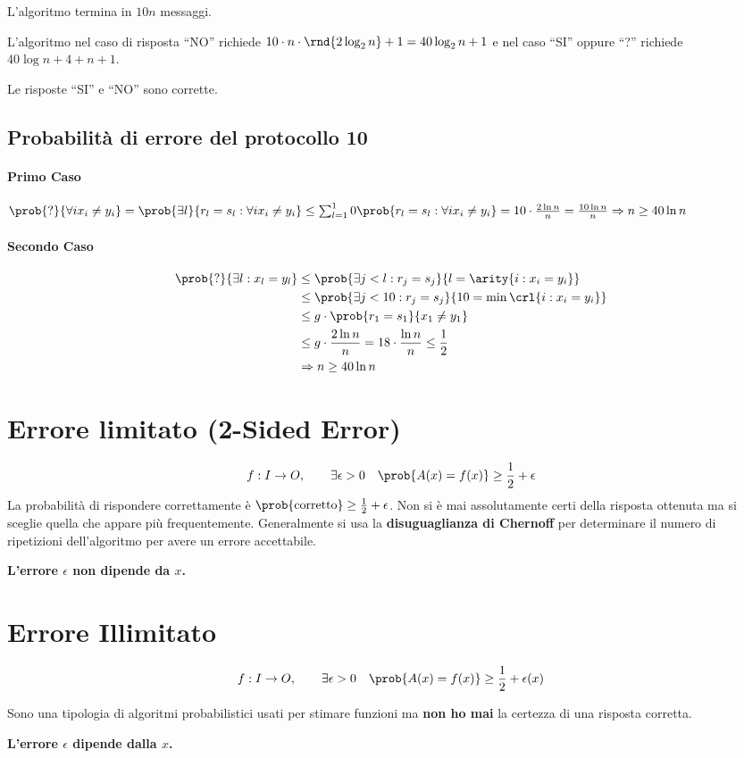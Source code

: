 \documentclass[\main/main.tex]{subfiles}
\begin{document}
L'algoritmo termina in \(10n\) messaggi.

L'algoritmo nel caso di risposta ``NO'' richiede \(10\cdot n \cdot \rnd{2 \log_2 n} + 1 = 40\log_2 n +1\) e nel caso ``SI'' oppure ``?'' richiede \(40 \log n + 4 + n +1\).

Le risposte ``SI'' e ``NO'' sono corrette.

\subsection{Probabilità di errore del protocollo 10}
\paragraph{Primo Caso} \(\prob{?}{\forall i x_i \neq y_i} = \prob{\exists l}{ r_l = s_l: \forall i x_i \neq y_i} \leq \sum_{l=1}^10 \prob{ r_l = s_l: \forall i x_i \neq y_i} = 10\cdot \frac{2\ln n}{n} = \frac{10\ln n}{n} \Rightarrow n \geq 40 \ln n\)
\paragraph{Secondo Caso}
\begin{align*}
	\prob{?}{\exists l: x_l = y_l} & \leq \prob{\exists j < l: r_j = s_j}{l= \arity{i: x_i = y_i}}           \\
	                               & \leq \prob{\exists j < 10: r_j = s_j}{10 = \min\crl{i: x_i = y_i}}      \\
	                               & \leq g\cdot \prob{r_1 = s_1}{x_1 \neq y_1}                              \\
	                               & \leq g\cdot \frac{2\ln n}{n} = 18\cdot \frac{\ln n}{n} \leq \frac{1}{2} \\
	                               & \Rightarrow n \geq 40 \ln n
\end{align*}

\section{Errore limitato (2-Sided Error)}
\[
	f: I \rightarrow O, \qquad \exists \epsilon > 0 \quad \prob{A(x) = f(x)} \geq \frac{1}{2} + \epsilon
\]
La probabilità di rispondere correttamente è \(\prob{\text{corretto}} \geq \frac{1}{2} + \epsilon\). Non si è mai assolutamente certi della risposta ottenuta ma si sceglie quella che appare più frequentemente. Generalmente si usa la \textbf{disuguaglianza di Chernoff} per determinare il numero di ripetizioni dell'algoritmo per avere un errore accettabile.

\textbf{L'errore \(\epsilon \) non dipende da \(x\).}

\section{Errore Illimitato}
\[
	f: I \rightarrow O, \qquad \exists \epsilon > 0 \quad \prob{A(x) = f(x)} \geq \frac{1}{2} + \epsilon(x)
\]

Sono una tipologia di algoritmi probabilistici usati per stimare funzioni ma \textbf{non ho mai} la certezza di una risposta corretta.

\textbf{L'errore \(\epsilon\) dipende dalla \(x\).}
\end{document}
